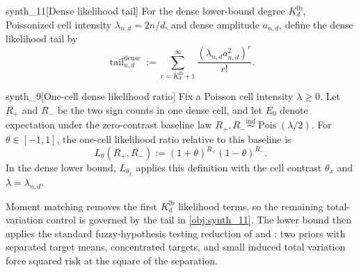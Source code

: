 \begin{definitionv}{synth_11}[Dense likelihood tail]
For the dense lower-bound degree \(K_d^{\mathrm{lb}}\), Poissonized cell intensity \(\lambda_{n,d}=2n/d\), and dense amplitude \(a_{n,d}\), define the dense likelihood tail by \[\operatorname{tail}_{n,d}^{\mathrm{dense}}:=\sum_{r=K_d^{\mathrm{lb}}+1}^{\infty}\frac{(\lambda_{n,d}a_{n,d}^2)^r}{r!}.\]
\end{definitionv}

\begin{definitionv}{synth_9}[One-cell dense likelihood ratio]
Fix a Poisson cell intensity \(\lambda\ge0\). Let \(R_+\) and \(R_-\) be the two sign counts in one dense cell, and let \(E_0\) denote expectation under the zero-contrast baseline law \(R_+,R_-\stackrel{\mathrm{ind}}{\sim}\operatorname{Pois}(\lambda/2)\). For \(\theta\in[-1,1]\), the one-cell likelihood ratio relative to this baseline is \[ L_\theta(R_+,R_-):=(1+\theta)^{R_+}(1-\theta)^{R_-}. \] In the dense lower bound, \(L_{\theta_x}\) applies this definition with the cell contrast \(\theta_x\) and \(\lambda=\lambda_{n,d}\).
\end{definitionv}

Moment matching removes the first \(K_d^{\mathrm{lb}}\) likelihood terms, so the remaining total-variation control is governed by the tail in \cref{obj:synth_11}. The lower bound then applies the standard fuzzy-hypothesis testing reduction of \citet{LeCam1986} and \citet{Tsybakov2009}: two priors with separated target means, concentrated targets, and small induced total variation force squared risk at the square of the separation.

